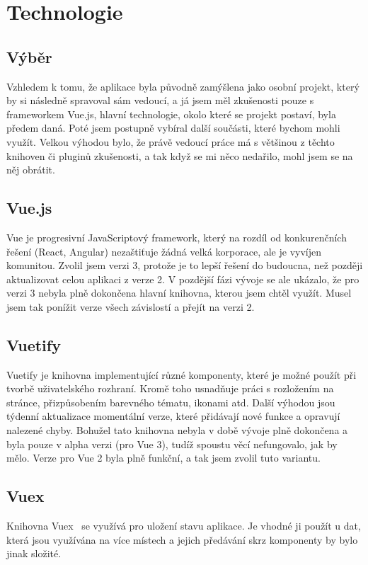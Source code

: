 
\chapter{Technologie}
\label{chap:technologie}

\section{Výběr}
Vzhledem k tomu, že aplikace byla původně zamýšlena jako osobní projekt, který by si následně spravoval sám vedoucí, a já
jsem měl zkušenosti pouze s frameworkem Vue.js, hlavní technologie, okolo které se projekt postaví, byla předem daná. Poté
jsem postupně vybíral další součásti, které bychom mohli využít. Velkou výhodou bylo, že právě vedoucí práce má s většinou
z těchto knihoven či pluginů zkušenosti, a tak když se mi něco nedařilo, mohl jsem se na něj obrátit.

\section{Vue.js}
Vue je progresivní JavaScriptový framework, který na rozdíl od konkurenčních řešení (React, Angular) nezaštiťuje žádná velká
korporace, ale je vyvíjen komunitou.\cite{VueJS} Zvolil jsem verzi 3, protože je to lepší řešení do budoucna, než později aktualizovat
celou aplikaci z verze 2. V pozdější fázi vývoje se ale ukázalo, že pro verzi 3 nebyla plně dokončena hlavní knihovna, kterou jsem chtěl využít.
Musel jsem tak ponížit verze všech závislostí a přejít na verzi 2.

\section{Vuetify}
Vuetify je knihovna implementující různé komponenty, které je možné použít při tvorbě uživatelského rozhraní. Kromě toho
usnadňuje práci s rozložením na stránce, přizpůsobením barevného tématu, ikonami atd. Další výhodou jsou týdenní aktualizace
momentální verze, které přidávají nové funkce a opravují nalezené chyby.\cite{VuetifyWhy}
Bohužel tato knihovna nebyla v době vývoje plně dokončena a byla pouze v alpha verzi (pro Vue 3), tudíž spoustu věcí nefungovalo, jak by mělo.
Verze pro Vue 2 byla plně funkční, a tak jsem zvolil tuto variantu.

\section{Vuex}
Knihovna Vuex~\cite{Vuex} se využívá pro uložení stavu aplikace. Je vhodné ji použít u dat, která jsou využívána na více místech a jejich
předávání skrz komponenty by bylo jinak složité.


